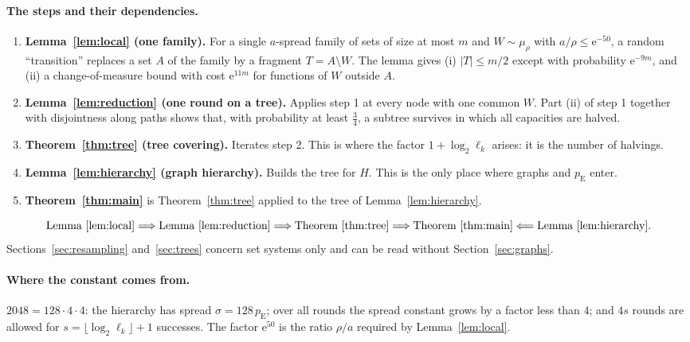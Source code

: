 \documentclass[11pt]{article}
\numberwithin{equation}{section}
\newcommand{\pE}{p_{\mathrm E}}
\newcommand{\ee}{\mathrm e}
\begin{document}
\paragraph{The steps and their dependencies.}
\begin{enumerate}[leftmargin=2em,itemsep=2pt]
 \item \textbf{Lemma~\ref{lem:local} (one family).} For a single
 $a$-spread family of sets of size at most $m$ and $W\sim\mu_\rho$ with
 $a/\rho\le\ee^{-50}$, a random ``transition'' replaces a set $A$ of the
 family by a fragment $T=A\setminus W$. The lemma gives (i) $|T|\le m/2$
 except with probability $\ee^{-9m}$, and (ii) a change-of-measure bound
 with cost $\ee^{11m}$ for functions of $W$ outside $A$.
 \item \textbf{Lemma~\ref{lem:reduction} (one round on a tree).}
 Applies step 1 at every node with one common $W$. Part (ii) of step 1
 together with disjointness along paths shows that, with probability at
 least $\frac34$, a subtree survives in which all capacities are halved.
 \item \textbf{Theorem~\ref{thm:tree} (tree covering).} Iterates
 step 2. This is where the factor $1+\log_2\ell_k$ arises: it is the
 number of halvings.
 \item \textbf{Lemma~\ref{lem:hierarchy} (graph hierarchy).} Builds the
 tree for $H$. This is the only place where graphs and $\pE$ enter.
 \item \textbf{Theorem~\ref{thm:main}} is Theorem~\ref{thm:tree}
 applied to the tree of Lemma~\ref{lem:hierarchy}.
\end{enumerate}
\[
 \text{Lemma~\ref{lem:local}}\Longrightarrow
 \text{Lemma~\ref{lem:reduction}}\Longrightarrow
 \text{Theorem~\ref{thm:tree}}\Longrightarrow
 \text{Theorem~\ref{thm:main}}\Longleftarrow
 \text{Lemma~\ref{lem:hierarchy}}.
\]
Sections~\ref{sec:resampling} and~\ref{sec:trees} concern set systems
only and can be read without Section~\ref{sec:graphs}.

\paragraph{Where the constant comes from.}
$2048=128\cdot4\cdot4$: the hierarchy has spread $\sigma=128\,\pE$; over
all rounds the spread constant grows by a factor less than $4$; and
$4s$ rounds are allowed for $s=\lfloor\log_2\ell_k\rfloor+1$ successes.
The factor $\ee^{50}$ is the ratio $\rho/a$ required by
Lemma~\ref{lem:local}.
\end{document}
